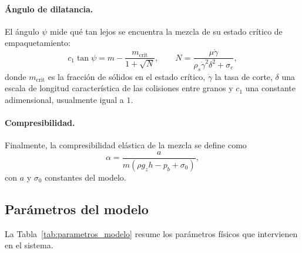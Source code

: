 \paragraph{Ángulo de dilatancia.} El ángulo $\psi$ mide qué tan lejos se encuentra la mezcla de su estado crítico de empaquetamiento:
\begin{equation}
    c_1\tan\psi = m - \frac{m_{\mathrm{crit}}}{1+\sqrt{N}},
    \qquad
    N = \frac{\mu\dot{\gamma}}{\rho_s\dot{\gamma}^2\delta^2 + \sigma_e},
    \label{eq:dilatancia}
\end{equation}
donde $m_{\mathrm{crit}}$ es la fracción de sólidos en el estado crítico, $\dot{\gamma}$ la tasa de corte, $\delta$ una escala de longitud característica de las colisiones entre granos y $c_1$ una constante adimensional, usualmente igual a $1$.

\paragraph{Compresibilidad.} Finalmente, la compresibilidad elástica de la mezcla se define como
\begin{equation}
    \alpha = \frac{a}{m\left(\rho g_z h - p_b + \sigma_0\right)},
    \label{eq:compresibilidad}
\end{equation}
con $a$ y $\sigma_0$ constantes del modelo.

\subsection{Parámetros del modelo}
\label{subsec:parametros}

La Tabla~\ref{tab:parametros_modelo} resume los parámetros físicos que intervienen en el sistema.

